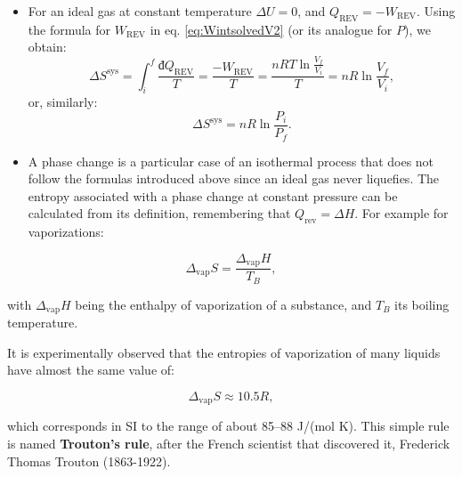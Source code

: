 \documentclass[
  9pt,
]{extbook}
\theoremstyle{definition}
\theoremstyle{definition}
\theoremstyle{definition}
\theoremstyle{definition}
\theoremstyle{remark}
\begin{document}
\begin{itemize}
\item
  For an ideal gas at constant temperature \(\Delta U =0\), and \(Q_{\mathrm{REV}} = -W_{\mathrm{REV}}\). Using the formula for \(W_{\mathrm{REV}}\) in eq. \eqref{eq:WintsolvedV2} (or its analogue for \(P\)), we obtain:
  \begin{equation}
  \Delta S^{\mathrm{sys}} = \int_i^f \frac{đQ_{\mathrm{REV}}}{T} = \frac{-W_{\mathrm{REV}}}{T} = \frac{nRT \ln \frac{V_f}{V_i}}{T} = nR \ln \frac{V_f}{V_i},
  \label{eq:sigconsttV}
  \end{equation}
  or, similarly:
  \begin{equation}
  \Delta S^{\mathrm{sys}} = nR \ln \frac{P_i}{P_f}.
  \label{eq:sigconsttP}
  \end{equation}
\item
  A phase change is a particular case of an isothermal process that does not follow the formulas introduced above since an ideal gas never liquefies. The entropy associated with a phase change at constant pressure can be calculated from its definition, remembering that \(Q_{\mathrm{rev}}= \Delta H\). For example for vaporizations:
\end{itemize}

\begin{equation}
\Delta_{\mathrm{vap}} S = \frac{\Delta_{\mathrm{vap}}H}{T_B},
\label{eq:spc}
\end{equation}

with \(\Delta_{\mathrm{vap}}H\) being the enthalpy of vaporization of a substance, and \(T_B\) its boiling temperature.

It is experimentally observed that the entropies of vaporization of many liquids have almost the same value of:

\begin{equation}
\Delta_{\mathrm{vap}} S \approx 10.5 R,
\label{eq:trouton}
\end{equation}

which corresponds in SI to the range of about 85--88 J/(mol K). This simple rule is named \textbf{Trouton's rule}, after the French scientist that discovered it, Frederick Thomas Trouton (1863-1922).
\end{document}
